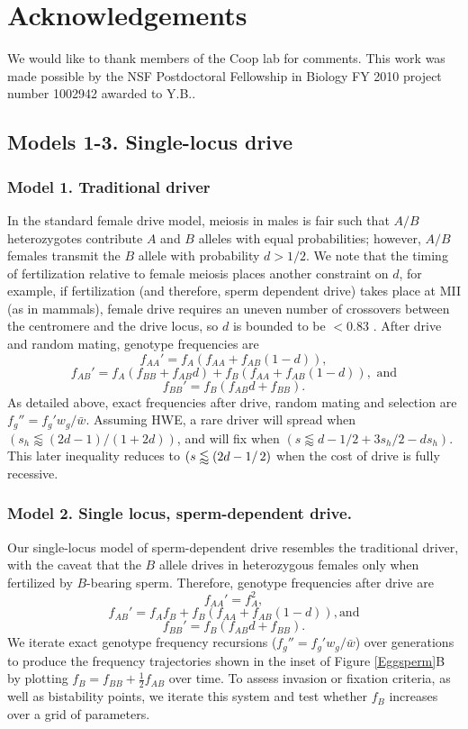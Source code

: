 \documentclass[12pt,letterpaper]{article}
\begin{document}
\newpage 
\section*{Acknowledgements}
We would like to thank members of the Coop lab for comments. This work was made possible by the NSF Postdoctoral Fellowship in Biology FY 2010 project number 1002942 awarded to Y.B..
\newpage 

\newpage 
  \appendix


\subsection*{Models 1-3. Single-locus drive}
\subsubsection*{Model 1. Traditional driver}
In the standard female drive model, meiosis in males is fair such that $A/B$ heterozygotes contribute $A$ and $B$ alleles with equal probabilities; however, $A/B$ females transmit the $B$ allele with probability $d>1/2$.  
We note that the timing of fertilization relative to female meiosis places another constraint on $d$, for example, if fertilization (and therefore, sperm dependent drive) takes place at MII (as in mammals),
	female drive requires an uneven number of crossovers between the centromere and the drive locus, 
	so $d$ is bounded to be $<0.83$ \citep[see ][ for discussion]{Buckler1999}. 
After drive and random mating, genotype frequencies are 
	$$f_{AA}'=f_A (f_{AA }+ f_{AB} (1 - d)),$$ 
	$$f_{AB}'=f_A (f_{BB} + f_{AB}d) + f_B (f_{AA} + f_{AB} (1 - d)),\text{ and}$$
	$$f_{BB}'= f_B (f_{AB} d + f_{BB}).$$ 
As detailed above, exact frequencies after drive, random mating and selection are $f_g''= f_g'w_g/\bar{w}$. 
Assuming HWE, a rare driver will spread when $\left(s_h
        \lessapprox \left(2d-1 \right)/\left(1+2d\right)\right)$, and will fix when $\left( s\lessapprox d -1/2 +
        3 s_h /2- d s_h \right) $. This later inequality reduces to
        $\left( s\lessapprox\left(2d-1\right/2 \right)$ when the cost of drive is fully
        recessive. 
	
\subsubsection*{Model 2. Single locus, sperm-dependent drive.}
Our single-locus model of sperm-dependent drive resembles the traditional driver, with the caveat that the $B$ allele drives in heterozygous females only when fertilized by $B$-bearing sperm. 
Therefore, genotype frequencies after drive are 
	$$f_{AA}'=f_A^2 , $$
	$$f_{AB}'=f_A f_B+f_B (f_{AA} + f_{AB}(1 - d)), \text{and} $$
	$$f_{BB}'= f_B (f_{AB} d + f_{BB} ).$$
We iterate exact genotype frequency recursions ($f_g''= f_g'w_g/\bar{w}$) over generations to produce the frequency trajectories shown in the inset of 
Figure \ref{Eggsperm}B by plotting $f_B=f_{BB}+ \frac{1}{2}f_{AB}$
over time. %
To assess invasion or fixation criteria, as well as bistability points, we iterate this system and
test whether $f_B$ increases over a grid of parameters. 
\end{document}
